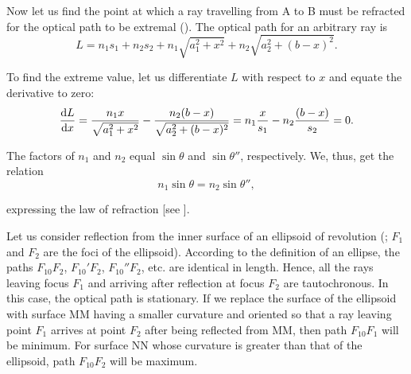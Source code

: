 
Now let us find the point at which a ray travelling from A to B must be refracted for the optical path to be extremal ().
The optical path for an arbitrary ray is
\begin{equation*}
    L = n_1 s_1 + n_2 s_2 + n_1 \sqrt{a_1^2 + x^2} + n_2 \sqrt{a_2^2 + (b - x)^2}.
\end{equation*}

\noindent
To find the extreme value, let us differentiate $L$ with respect to $x$ and equate the derivative to zero:
\begin{equation*}
    \dfrac{\mathrm{d} L}{\mathrm{d} x} = \frac{n_1 x}{\sqrt{a_1^2 + x^2}} - \frac{n_2 (b - x)}{\sqrt{a_2^2 + (b - x)^2}} = n_1 \frac{x}{s_1} - n_2 \frac{(b-x)}{s_2} = 0.
\end{equation*}

\noindent
The factors of $n_1$ and $n_2$ equal $\sin\theta$ and $\sin\theta''$, respectively.
We, thus, get the relation
\begin{equation*}
    n_1 \sin\theta = n_2 \sin\theta'',
\end{equation*}

\noindent
expressing the law of refraction [see ].

Let us consider reflection from the inner surface of an ellipsoid of revolution (; $F_1$ and $F_2$ are the foci of the ellipsoid).
According to the definition of an ellipse, the paths $F_10F_2$, $F_10'F_2$, $F_10''F_2$, etc. are identical in length.
Hence, all the rays leaving focus $F_1$ and arriving after reflection at focus $F_2$ are tautochronous.
In this case, the optical path is stationary.
If we replace the surface of the ellipsoid with surface MM having a smaller curvature and oriented so that a ray leaving point $F_1$ arrives at point $F_2$ after being reflected from MM, then path $F_10F_1$ will be minimum.
For surface NN whose curvature is greater than that of the ellipsoid, path $F_10F_2$ will be maximum.

